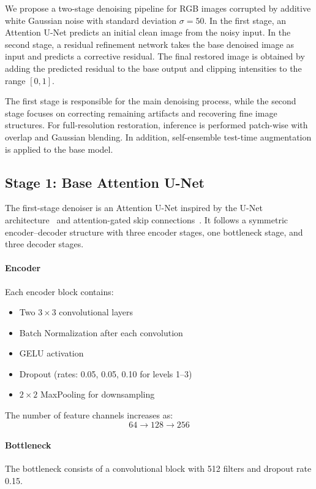 \documentclass[10pt,twocolumn,letterpaper]{article}
\begin{document}
We propose a two-stage denoising pipeline for RGB images corrupted by additive white Gaussian noise with standard deviation $\sigma=50$. In the first stage, an Attention U-Net predicts an initial clean image from the noisy input. In the second stage, a residual refinement network takes the base denoised image as input and predicts a corrective residual. The final restored image is obtained by adding the predicted residual to the base output and clipping intensities to the range $[0,1]$.

The first stage is responsible for the main denoising process, while the second stage focuses on correcting remaining artifacts and recovering fine image structures. For full-resolution restoration, inference is performed patch-wise with overlap and Gaussian blending. In addition, self-ensemble test-time augmentation is applied to the base model.

\subsection{Stage 1: Base Attention U-Net}

The first-stage denoiser is an Attention U-Net inspired by the U-Net architecture~\cite{ronneberger2015unet} and attention-gated skip connections~\cite{oktay2018attention}. It follows a symmetric encoder--decoder structure with three encoder stages, one bottleneck stage, and three decoder stages.

\paragraph{Encoder}
Each encoder block contains:
\begin{itemize}
\item Two $3\times3$ convolutional layers
\item Batch Normalization after each convolution
\item GELU activation
\item Dropout (rates: 0.05, 0.05, 0.10 for levels 1--3)
\item $2\times2$ MaxPooling for downsampling
\end{itemize}

The number of feature channels increases as:
\[
64 \rightarrow 128 \rightarrow 256
\]

\paragraph{Bottleneck}
The bottleneck consists of a convolutional block with 512 filters and dropout rate 0.15.
\end{document}
